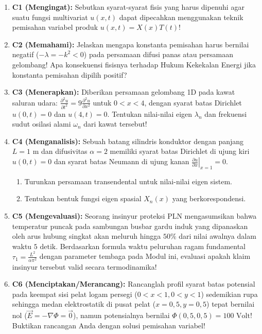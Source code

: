 \documentclass[11pt,a4paper]{article}
\theoremstyle{definition}
\begin{document}
\begin{enumerate}[leftmargin=*]
    \item \textbf{C1 (Mengingat):} 
    Sebutkan syarat-syarat fisis yang harus dipenuhi agar suatu fungsi multivariat $u(x, t)$ dapat dipecahkan menggunakan teknik pemisahan variabel produk $u(x, t) = X(x) T(t)$!
    
    \item \textbf{C2 (Memahami):} 
    Jelaskan mengapa konstanta pemisahan harus bernilai negatif ($-\lambda = -k^2 < 0$) pada persamaan difusi panas atau persamaan gelombang! Apa konsekuensi fisisnya terhadap Hukum Kekekalan Energi jika konstanta pemisahan dipilih positif?
    
    \item \textbf{C3 (Menerapkan):} 
    Diberikan persamaan gelombang 1D pada kawat saluran udara: $\frac{\partial^2 u}{\partial t^2} = 9 \frac{\partial^2 u}{\partial x^2}$ untuk $0 < x < 4$, dengan syarat batas Dirichlet $u(0, t) = 0$ dan $u(4, t) = 0$. Tentukan nilai-nilai eigen $\lambda_n$ dan frekuensi sudut osilasi alami $\omega_n$ dari kawat tersebut!
    
    \item \textbf{C4 (Menganalisis):} 
    Sebuah batang silindris konduktor dengan panjang $L = 1\text{ m}$ dan difusivitas $\alpha = 2$ memiliki syarat batas Dirichlet di ujung kiri $u(0, t) = 0$ dan syarat batas Neumann di ujung kanan $\left.\frac{\partial u}{\partial x}\right|_{x=1} = 0$.
    \begin{enumerate}
        \item Turunkan persamaan transendental untuk nilai-nilai eigen sistem.
        \item Tentukan bentuk fungsi eigen spasial $X_n(x)$ yang berkorespondensi.
    \end{enumerate}
    
    \item \textbf{C5 (Mengevaluasi):} 
    Seorang insinyur proteksi PLN mengasumsikan bahwa temperatur puncak pada sambungan busbar gardu induk yang dipanaskan oleh arus hubung singkat akan meluruh hingga $50\%$ dari nilai awalnya dalam waktu $5\text{ detik}$. Berdasarkan formula waktu peluruhan ragam fundamental $\tau_1 = \frac{L^2}{\alpha \pi^2}$ dengan parameter tembaga pada Modul ini, evaluasi apakah klaim insinyur tersebut valid secara termodinamika!
    
    \item \textbf{C6 (Menciptakan/Merancang):} 
    Rancanglah profil syarat batas potensial pada keempat sisi pelat logam persegi ($0 < x < 1, 0 < y < 1$) sedemikian rupa sehingga medan elektrostatik di pusat pelat ($x = 0{,}5, y = 0{,}5$) tepat bernilai nol ($\vec{E} = -\nabla \Phi = \vec{0}$), namun potensialnya bernilai $\Phi(0{,}5, 0{,}5) = 100\text{ Volt}$! Buktikan rancangan Anda dengan solusi pemisahan variabel!
\end{enumerate}
\end{document}

